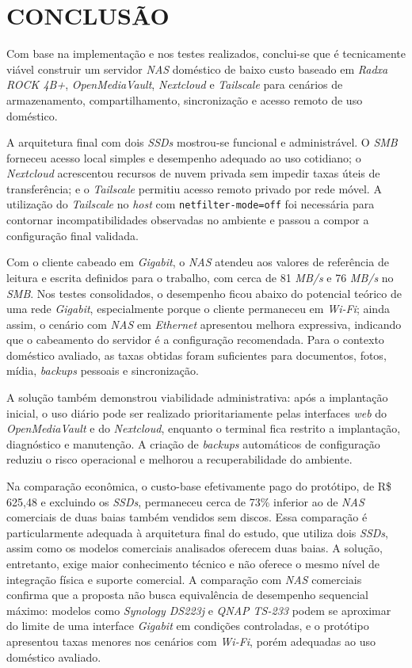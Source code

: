 
\chapter{CONCLUSÃO}
\label{cap:conclusao}

Com base na implementação e nos testes realizados, conclui-se que é tecnicamente viável construir um servidor \textit{NAS} doméstico de baixo custo baseado em \textit{Radxa ROCK 4B+}, \textit{OpenMediaVault}, \textit{Nextcloud} e \textit{Tailscale} para cenários de armazenamento, compartilhamento, sincronização e acesso remoto de uso doméstico.

A arquitetura final com dois \textit{SSDs} mostrou-se funcional e administrável. O \textit{SMB} forneceu acesso local simples e desempenho adequado ao uso cotidiano; o \textit{Nextcloud} acrescentou recursos de nuvem privada sem impedir taxas úteis de transferência; e o \textit{Tailscale} permitiu acesso remoto privado por rede móvel. A utilização do \textit{Tailscale} no \textit{host} com \texttt{netfilter-mode=off} foi necessária para contornar incompatibilidades observadas no ambiente e passou a compor a configuração final validada.

Com o cliente cabeado em \textit{Gigabit}, o \textit{NAS} atendeu aos valores de referência de leitura e escrita definidos para o trabalho, com cerca de 81 \textit{MB/s} e 76 \textit{MB/s} no \textit{SMB}. Nos testes consolidados, o desempenho ficou abaixo do potencial teórico de uma rede \textit{Gigabit}, especialmente porque o cliente permaneceu em \textit{Wi-Fi}; ainda assim, o cenário com \textit{NAS} em \textit{Ethernet} apresentou melhora expressiva, indicando que o cabeamento do servidor é a configuração recomendada. Para o contexto doméstico avaliado, as taxas obtidas foram suficientes para documentos, fotos, mídia, \textit{backups} pessoais e sincronização.

A solução também demonstrou viabilidade administrativa: após a implantação inicial, o uso diário pode ser realizado prioritariamente pelas interfaces \textit{web} do \textit{OpenMediaVault} e do \textit{Nextcloud}, enquanto o terminal fica restrito a implantação, diagnóstico e manutenção. A criação de \textit{backups} automáticos de configuração reduziu o risco operacional e melhorou a recuperabilidade do ambiente.

Na comparação econômica, o custo-base efetivamente pago do protótipo, de R\$ 625,48 e excluindo os \textit{SSDs}, permaneceu cerca de 73\% inferior ao de \textit{NAS} comerciais de duas baias também vendidos sem discos. Essa comparação é particularmente adequada à arquitetura final do estudo, que utiliza dois \textit{SSDs}, assim como os modelos comerciais analisados oferecem duas baias. A solução, entretanto, exige maior conhecimento técnico e não oferece o mesmo nível de integração física e suporte comercial. A comparação com \textit{NAS} comerciais confirma que a proposta não busca equivalência de desempenho sequencial máximo: modelos como \textit{Synology DS223j} e \textit{QNAP TS-233} podem se aproximar do limite de uma interface \textit{Gigabit} em condições controladas, e o protótipo apresentou taxas menores nos cenários com \textit{Wi-Fi}, porém adequadas ao uso doméstico avaliado.

